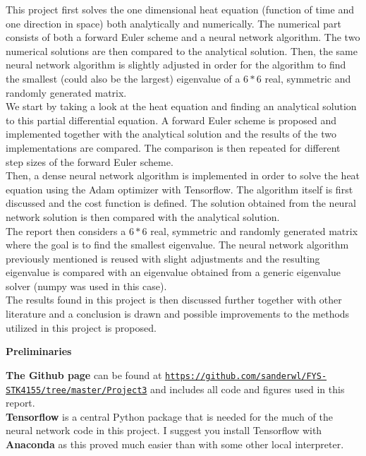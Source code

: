 \documentclass[12pt,a4paper]{article}
\begin{document}
\noindent This project first solves the one dimensional heat equation (function of time and one direction in space) both analytically and numerically. The numerical part consists of both a forward Euler scheme and a neural network algorithm. The two numerical solutions are then compared to the analytical solution. Then, the same neural network algorithm is slightly adjusted in order for the algorithm to find the smallest (could also be the largest) eigenvalue of a $6*6$ real, symmetric and randomly generated matrix.
\\
We start by taking a look at the heat equation and finding an analytical solution to this partial differential equation. A forward Euler scheme is proposed and implemented together with the analytical solution and the results of the two implementations are compared. The comparison is then repeated for different step sizes of the forward Euler scheme.
\\
Then, a dense neural network algorithm is implemented in order to solve the heat equation using the Adam optimizer with Tensorflow. The algorithm itself is first discussed and the cost function is defined. The solution obtained from the neural network solution is then compared with the analytical solution.
\\
The report then considers a $6*6$ real, symmetric and randomly generated matrix where the goal is to find the smallest eigenvalue. The neural network algorithm previously mentioned is reused with slight adjustments and the resulting eigenvalue is compared with an eigenvalue obtained from a generic eigenvalue solver (numpy was used in this case).
\\
The results found in this project is then discussed further together with other literature and a conclusion is drawn and possible improvements to the methods utilized in this project is proposed.

\newpage

\begin{center}
\Large{\textbf{Preliminaries}}
\end{center}

\noindent \textbf{The Github page} can be found at \href{{https://github.com/sanderwl/FYS-STK4155/tree/master/Project3}}{\nolinkurl{https://github.com/sanderwl/FYS-STK4155/tree/master/Project3}} and includes all code and figures used in this report.
\\
\textbf{Tensorflow} is a central Python package that is needed for the much of the neural network code in this project. I suggest you install Tensorflow with \textbf{Anaconda} as this proved much easier than with some other local interpreter.
\end{document}
